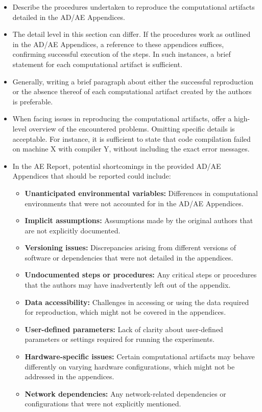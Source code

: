 \documentclass[conference]{IEEEtran}
\begin{document}
\aerwhat


\begin{aerhint}
\begin{itemize}
    \item Describe the procedures undertaken to reproduce the computational artifacts detailed in the AD/AE Appendices.
    \item The detail level in this section can differ. If the procedures work as outlined in the AD/AE Appendices, a reference to these appendices suffices, confirming successful execution of the steps.
    In such instances, a brief statement for each computational artifact is sufficient.
    \item Generally, writing a brief paragraph about either the successful reproduction or the absence thereof of each computational artifact created by the authors is preferable.
    \item When facing issues in reproducing the computational artifacts, offer a high-level overview of the encountered problems. Omitting specific details is acceptable. For instance, it is sufficient to state that code compilation failed on machine X with compiler Y, without including the exact error messages.
    \item In the AE Report, potential shortcomings in the provided AD/AE Appendices that should be reported could include:
    \begin{itemize}
        \item \textbf{Unanticipated environmental variables:} Differences in computational environments that were not accounted for in the AD/AE Appendices.
        \item \textbf{Implicit assumptions:} Assumptions made by the original authors that are not explicitly documented.
        \item \textbf{Versioning issues:} Discrepancies arising from different versions of software or dependencies that were not detailed in the appendices.
        \item \textbf{Undocumented steps or procedures:} Any critical steps or procedures that the authors may have inadvertently left out of the appendix.
        \item \textbf{Data accessibility:} Challenges in accessing or using the data required for reproduction, which might not be covered in the appendices.
        \item \textbf{User-defined parameters:} Lack of clarity about user-defined parameters or settings required for running the experiments.
        \item \textbf{Hardware-specific issues:} Certain computational artifacts may behave differently on varying hardware configurations, which might not be addressed in the appendices.
        \item \textbf{Network dependencies:} Any network-related dependencies or configurations that were not explicitly mentioned.
    \end{itemize}
\end{itemize}
\end{aerhint}

\aerdisclaimer
\end{document}
